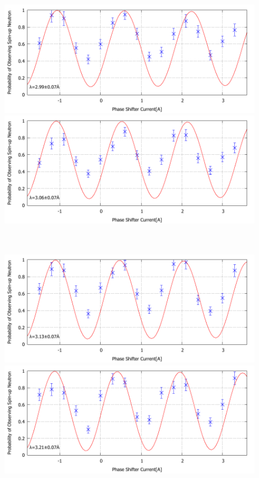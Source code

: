 \begin{figure}[h]
\begin{minipage}{0.5\hsize}
\includegraphics[width=\hsize]{analysis/GO/IT_e_420.pdf}
\end{minipage}
\begin{minipage}{0.5\hsize}
\includegraphics[width=\hsize]{analysis/GO/IT_e_430.pdf}
\end{minipage}\\
\begin{minipage}{0.5\hsize}
\includegraphics[width=\hsize]{analysis/GO/IT_e_440.pdf}
\end{minipage}
\begin{minipage}{0.5\hsize}
\includegraphics[width=\hsize]{analysis/GO/IT_e_450.pdf}

\end{minipage}
\end{figure}
